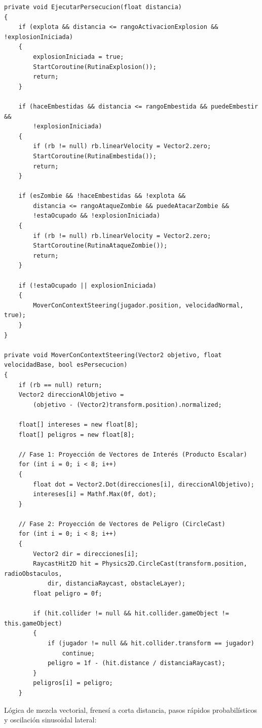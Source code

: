 \begin{verbatim}
private void EjecutarPersecucion(float distancia)
{
    if (explota && distancia <= rangoActivacionExplosion && !explosionIniciada)
    {
        explosionIniciada = true;
        StartCoroutine(RutinaExplosion());
        return;
    }
    
    if (haceEmbestidas && distancia <= rangoEmbestida && puedeEmbestir && 
        !explosionIniciada)
    {
        if (rb != null) rb.linearVelocity = Vector2.zero;
        StartCoroutine(RutinaEmbestida());
        return;
    }

    if (esZombie && !haceEmbestidas && !explota && 
        distancia <= rangoAtaqueZombie && puedeAtacarZombie && 
        !estaOcupado && !explosionIniciada)
    {
        if (rb != null) rb.linearVelocity = Vector2.zero;
        StartCoroutine(RutinaAtaqueZombie());
        return;
    }
    
    if (!estaOcupado || explosionIniciada) 
    {
        MoverConContextSteering(jugador.position, velocidadNormal, true);
    }
}

private void MoverConContextSteering(Vector2 objetivo, float velocidadBase, bool esPersecucion)
{
    if (rb == null) return;
    Vector2 direccionAlObjetivo = 
        (objetivo - (Vector2)transform.position).normalized;
    
    float[] intereses = new float[8];
    float[] peligros = new float[8];

    // Fase 1: Proyección de Vectores de Interés (Producto Escalar)
    for (int i = 0; i < 8; i++)
    {
        float dot = Vector2.Dot(direcciones[i], direccionAlObjetivo);
        intereses[i] = Mathf.Max(0f, dot);
    }

    // Fase 2: Proyección de Vectores de Peligro (CircleCast)
    for (int i = 0; i < 8; i++)
    {
        Vector2 dir = direcciones[i];
        RaycastHit2D hit = Physics2D.CircleCast(transform.position, radioObstaculos, 
            dir, distanciaRaycast, obstacleLayer);
        float peligro = 0f;

        if (hit.collider != null && hit.collider.gameObject != this.gameObject)
        {
            if (jugador != null && hit.collider.transform == jugador)
                continue;
            peligro = 1f - (hit.distance / distanciaRaycast);
        }
        peligros[i] = peligro;
    }
\end{verbatim}

\clearpage
Lógica de mezcla vectorial, frenesí a corta distancia, pasos rápidos probabilísticos y oscilación sinusoidal lateral:

